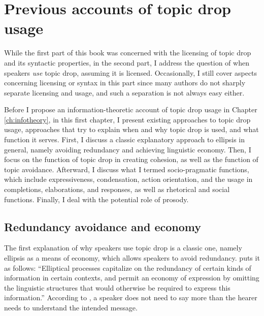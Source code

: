 \chapter{Previous accounts of topic drop usage}\label{ch:pusage}
While the first part of this book was concerned with the licensing of topic drop and its syntactic properties, in the second part, I address the question of when speakers \textit{use} topic drop, assuming it is licensed.
Occasionally, I still cover aspects concerning licensing or syntax in this part since many authors do not sharply separate licensing and usage, and such a separation is not always easy either.

Before I propose an information-theoretic account of topic drop usage in Chapter \ref{ch:infotheory}, in this first chapter, I present existing approaches to topic drop usage, approaches that try to explain when and why topic drop is used, and what function it serves.
First, I discuss a classic explanatory approach to ellipsis in general, namely avoiding redundancy and achieving linguistic economy.
Then, I focus on the function of topic drop in creating cohesion, as well as the function of topic avoidance.
Afterward, I discuss what I termed socio-pragmatic functions, which include expressiveness, condensation, action orientation, and the usage in completions, elaborations, and responses, as well as rhetorical and social functions.
Finally, I deal with the potential role of prosody.

\section{Redundancy avoidance and economy}\label{sec:pusage.economy}
\largerpage[-1]
The first explanation of why speakers use topic drop is a classic one, namely ellipsis as a means of economy, which allows speakers to avoid redundancy.
\citet[1]{merchant2001} puts it as follows:
``Elliptical processes capitalize on the redundancy of certain kinds of information in certain contexts, and permit an economy of expression by omitting the linguistic structures that would otherwise be required to express this information.''
According to \citet[103]{schwitalla2012}, a speaker does not need to say more than the hearer needs to understand the intended message.

